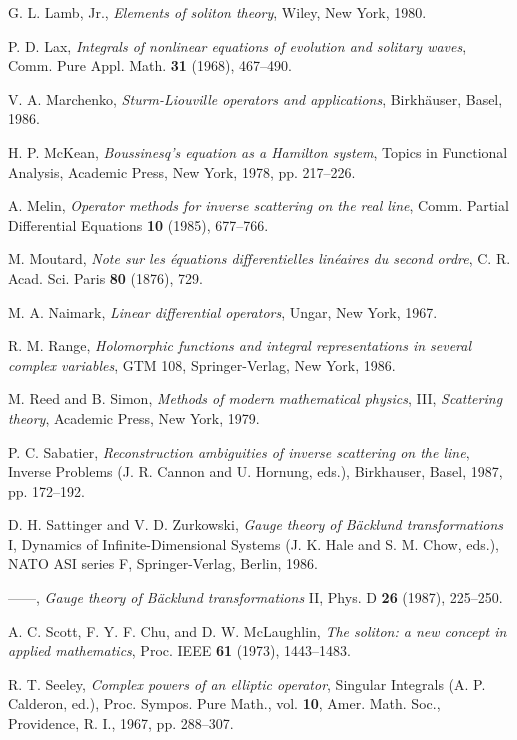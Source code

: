 \documentclass{surv-l}
\theoremstyle{plain}
\theoremstyle{definition}
\numberwithin{equation}{chapter}
\begin{document}
\begin{thebibliography}{AKNS}
 G. L. Lamb, Jr., \emph{Elements of soliton theory}, Wiley, New York, 1980.

 P. D. Lax, \emph{Integrals of nonlinear equations of evolution and solitary waves}, Comm. Pure Appl. Math. \textbf{31} (1968), 467--490.

 V. A. Marchenko, \emph{Sturm-Liouville operators and applications}, Birkh\"{a}user, Basel, 1986.

 H. P. McKean, \emph{Boussinesq's equation as a Hamilton system}, Topics in Functional Analysis, Academic Press, New York, 1978, pp. 217--226.

 A. Melin, \emph{Operator methods for inverse scattering on the real line}, Comm. Partial Differential Equations \textbf{10} (1985), 677--766.

 M. Moutard, \emph{Note sur les \'{e}quations differentielles lin\'{e}aires du second ordre}, C. R. Acad. Sci. Paris \textbf{80} (1876), 729.

 M. A. Naimark, \emph{Linear differential operators}, Ungar, New York, 1967.

 R. M. Range, \emph{Holomorphic functions and integral representations in several complex variables}, GTM 108, Springer-Verlag, New York, 1986.

 M. Reed and B. Simon, \emph{Methods of modern mathematical physics}, III, \emph{Scattering theory}, Academic Press, New York, 1979.

 P. C. Sabatier, \emph{Reconstruction ambiguities of inverse scattering on the line}, Inverse Problems (J. R. Cannon and U. Hornung, eds.), Birkhauser, Basel, 1987, pp. 172--192.

 D. H. Sattinger and V. D. Zurkowski, \emph{Gauge theory of B\"{a}cklund transformations} I, Dynamics of Infinite-Dimensional Systems (J. K. Hale and S. M. Chow, eds.), NATO ASI series F, Springer-Verlag, Berlin, 1986.

 ------, \emph{Gauge theory of B\"{a}cklund transformations} II, Phys. D \textbf{26} (1987), 225--250.

 A. C. Scott, F. Y. F. Chu, and D. W. McLaughlin, \emph{The soliton: a new concept in applied mathematics}, Proc. IEEE \textbf{61} (1973), 1443--1483.

 R. T. Seeley, \emph{Complex powers of an elliptic operator}, Singular Integrals (A. P. Calderon, ed.), Proc. Sympos. Pure Math., vol. \textbf{10}, Amer. Math. Soc., Providence, R. I., 1967, pp. 288--307.


\end{thebibliography}
\end{document}
